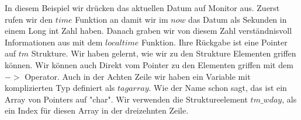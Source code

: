 In diesem Beispiel wir drücken das aktuellen Datum auf Monitor aus. Zuerst rufen wir den $time$ Funktion
an damit wir  im $now$ das Datum als Sekunden in einem Long int Zahl haben. Danach graben wir von diesem Zahl 
verständnisvoll Informationen aus mit dem $localtime$ Funktion. Ihre Rückgabe ist eine Pointer auf $tm$ Strukture. 
Wir haben gelernt, wie wir zu den Strukture Elementen griffen können. Wir können auch Direkt vom Pointer
zu den Elementen griffen mit dem $->$ Operator. Auch in der Achten Zeile wir haben ein Variable mit komplizierten
Typ definiert als $tagarray$. Wie der Name schon sagt, das ist ein Array von Pointers auf "char". Wir verwenden
die Struktureelement $tm\_wday$, als ein Index für diesen Array in der dreizehnten Zeile.
